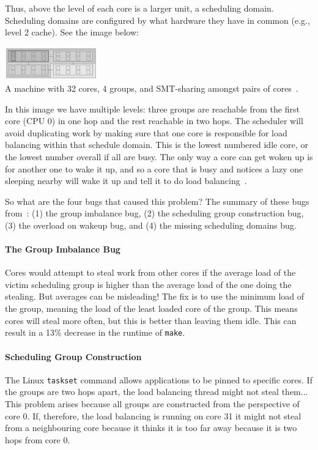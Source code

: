 Thus, above the level of each core is a larger unit, a scheduling domain. Scheduling domains are configured by what hardware they have in common (e.g., level 2 cache). See the image below:

\begin{center}
	\includegraphics[width=0.3\textwidth]{images/wastedcores.png}\\
	A machine with 32 cores, 4 groups, and SMT-sharing amongst pairs of cores~\cite{wastedcores}.
\end{center}

In this image we have multiple levels: three groups are reachable from the first core (CPU 0) in one hop and the rest reachable in two hops. The scheduler will avoid duplicating work by making sure that one core is responsible for load balancing within that schedule domain. This is the lowest numbered idle core, or the lowest number overall if all are busy. The only way a core can get woken up is for another one to wake it up, and so a core that is busy and notices a lazy one sleeping nearby will wake it up and tell it to do load balancing~\cite{wastedcores2}.

So what are the four bugs that caused this problem? The summary of these bugs from~\cite{wastedcores2}: (1) the group imbalance bug, (2) the scheduling group construction bug, (3) the overload on wakeup bug, and (4) the missing scheduling domains bug.

\paragraph{The Group Imbalance Bug} Cores would attempt to steal work from other cores if the average load of the victim scheduling group is higher than the average load of the one doing the stealing. But averages can be misleading! The fix is to use the minimum load of the group, meaning the load of the least loaded core of the group. This means cores will steal more often, but this is better than leaving them idle. This can result in a 13\% decrease in the runtime of \texttt{make}.

\paragraph{Scheduling Group Construction} The Linux \texttt{taskset} command allows applications to be pinned to specific cores. If the groups are two hops apart, the load balancing thread might not steal them... This problem arises because all groups are constructed from the perspective of core 0. If, therefore, the load balancing is running on core 31 it might not steal from a neighbouring core because it thinks it is too far away because it is two hops from core 0.

